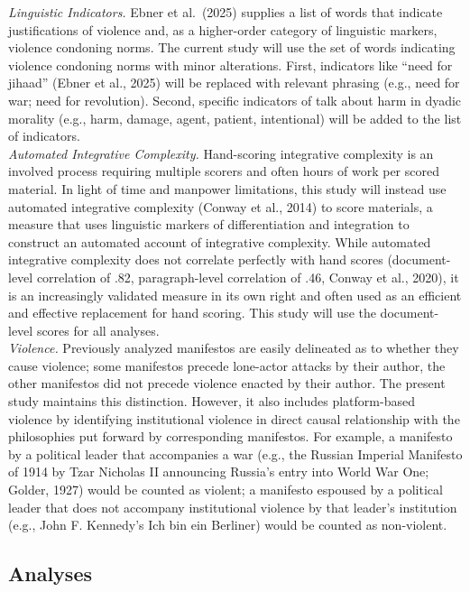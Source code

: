 \documentclass[
  english,
  man]{apa6}
\begin{document}
\emph{Linguistic Indicators.} Ebner et al.~(2025) supplies a list of words that indicate
justifications of violence and, as a higher-order category of linguistic markers, violence
condoning norms. The current study will use the set of words indicating violence condoning
norms with minor alterations. First, indicators like ``need for jihaad'' (Ebner et al., 2025)
will be replaced with relevant phrasing (e.g., need for war; need for revolution). Second,
specific indicators of talk about harm in dyadic morality (e.g., harm, damage, agent,
patient, intentional) will be added to the list of indicators.\\
\emph{Automated Integrative Complexity.} Hand-scoring integrative complexity is an involved
process requiring multiple scorers and often hours of work per scored material. In light of
time and manpower limitations, this study will instead use automated integrative complexity
(Conway et al., 2014) to score materials, a measure that uses linguistic markers of
differentiation and integration to construct an automated account of integrative complexity.
While automated integrative complexity does not correlate perfectly with hand scores
(document-level correlation of .82, paragraph-level correlation of .46, Conway et al.,
2020), it is an increasingly validated measure in its own right and often used as an
efficient and effective replacement for hand scoring. This study will use the document-level
scores for all analyses.\\
\emph{Violence.} Previously analyzed manifestos are easily delineated as to whether they cause
violence; some manifestos precede lone-actor attacks by their author, the other manifestos
did not precede violence enacted by their author. The present study maintains this
distinction. However, it also includes platform-based violence by identifying institutional
violence in direct causal relationship with the philosophies put forward by corresponding
manifestos. For example, a manifesto by a political leader that accompanies a war (e.g., the
Russian Imperial Manifesto of 1914 by Tzar Nicholas II announcing Russia's entry into World
War One; Golder, 1927) would be counted as violent; a manifesto espoused by a political
leader that does not accompany institutional violence by that leader's institution (e.g.,
John F. Kennedy's Ich bin ein Berliner) would be counted as non-violent.

\subsection{Analyses}\label{analyses}
\end{document}
